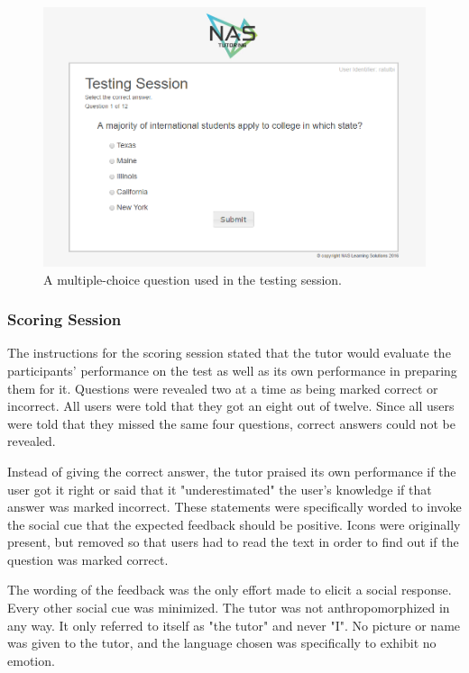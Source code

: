 \documentclass{sig-alternate-05-2015}
\begin{document}
\begin{figure}[!h]
    \includegraphics[width=\linewidth]{figures/website/06_testing.png}
    \caption{A multiple-choice question used in the testing session.}
    \label{TestingFigure}
\end{figure}


\subsubsection{Scoring Session}
The instructions for the scoring session stated that the tutor would evaluate the participants' performance on the test as well as its own performance in preparing them for it.  Questions were revealed two at a time as being marked correct or incorrect.  All users were told that they got an eight out of twelve.  Since all users were told that they  missed the same four questions, correct answers could not be revealed.  

Instead of giving the correct answer, the tutor praised its own performance if the user got it right or said that it "underestimated" the user's knowledge if that answer was marked incorrect.  These statements were specifically worded to invoke the social cue that the expected feedback should be positive. Icons were originally present, but removed so that users had to read the text in order to find out if the question was marked correct. 

The wording of the feedback was the only effort made to elicit a social response. Every other social cue was minimized.  The tutor was not anthropomorphized in any way.  It only referred to itself as "the tutor" and never "I".  No picture or name was given to the tutor, and the language chosen was specifically to exhibit no emotion.  
\end{document}
